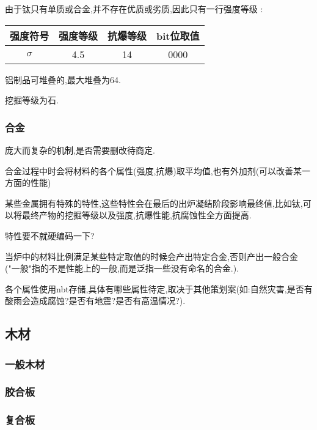 {{{          由于钛只有单质或合金,并不存在优质或劣质,因此只有一行强度等级 :
          \begin{center}
              \begin{tabular}{|c|c|c|c|}
                  \hline
                  强度符号 & 强度等级 & 抗爆等级 & bit位取值 \\
                  \hline
                  $\sigma$ & 4.5      & 14       & 0000      \\
                  \hline
              \end{tabular}
          \end{center}

          铝制品可堆叠的,最大堆叠为64.

          挖掘等级为石.
      }

      \subsubsection{合金}{
          庞大而复杂的机制,是否需要删改待商定.

          合金过程中时会将材料的各个属性(强度,抗爆)取平均值,也有外加剂(可以改善某一方面的性能)

          某些金属拥有特殊的特性,这些特性会在最后的出炉凝结阶段影响最终值,比如钛,可以将最终产物的挖掘等级以及强度,抗爆性能,抗腐蚀性全方面提高.

          特性要不就硬编码一下?

          当炉中的材料比例满足某些特定取值的时候会产出特定合金,否则产出一般合金("一般"指的不是性能上的一般,而是泛指一些没有命名的合金.).

          各个属性使用nbt存储,具体有哪些属性待定,取决于其他策划案(如:自然灾害,是否有酸雨会造成腐蚀?是否有地震?是否有高温情况?).
      }
  }

  \subsection{木材}{
      \subsubsection{一般木材}{

      }

      \subsubsection{胶合板}{

      }

      \subsubsection{复合板}{

}}}
